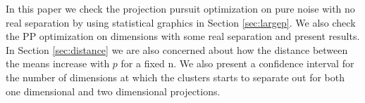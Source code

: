 \documentclass[12]{report}
\newtheorem{dfn}{Definition}[section]
\begin{document}
In this paper we check the projection pursuit optimization on pure noise with no real separation by using statistical graphics in Section \ref{sec:largep}. We also check the PP optimization on dimensions with some real separation and present results. In Section  \ref{sec:distance} we are also concerned about how the distance between the means increase with $p$ for a fixed n. We also present a confidence interval for the number of dimensions at which the clusters starts to separate out for both one dimensional and two dimensional projections.

%
%
%
%
%
\end{document}

